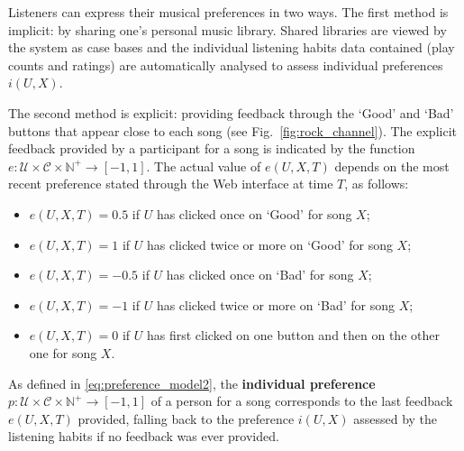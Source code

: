 Listeners can express their musical preferences in two ways. 
The first method is implicit: by sharing one's personal music library.
Shared libraries are viewed by the system as case bases and the individual listening habits data contained (play counts and ratings) are automatically analysed to assess individual preferences $i(U,X)$.

The second method is explicit: providing feedback through the `Good' and `Bad' buttons that appear close to each song (see Fig.~\ref{fig:rock_channel}).
The explicit feedback provided by a participant for a song is indicated by the function $e: \mathcal{U} \times \mathcal{C} \times \mathbb{N}^+ \to [-1,1]$.
The actual value of $e(U,X,T)$ depends on the most recent preference stated through the Web interface at time $T$, as follows:
\begin{itemize}
 \item $e(U,X,T) = 0.5$ if $U$ has clicked once on `Good' for song $X$; 
 \item $e(U,X,T) = 1$ if $U$ has clicked twice or more on `Good' for song $X$; 
 \item $e(U,X,T) = -0.5$ if $U$ has clicked once on `Bad' for song $X$; 
 \item $e(U,X,T) = -1$ if $U$ has clicked twice or more on `Bad' for song $X$; 
 \item $e(U,X,T) = 0$ if $U$ %
has first clicked on one button and then on the other one for song $X$.
\end{itemize}


As defined in \eqref{eq:preference_model2}, the \textbf{individual preference} $p: \mathcal{U} \times \mathcal{C} \times \mathbb{N}^+ \to [-1,1]$ of a person for a song corresponds to the last feedback $e(U,X,T)$ provided, falling back to the preference $i(U,X)$ assessed by the listening habits if no feedback 
was ever provided.


